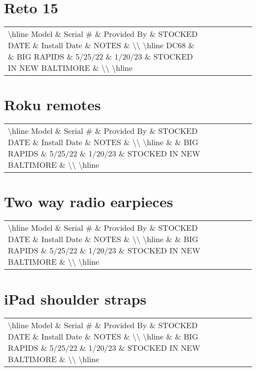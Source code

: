 \documentclass{article}%
\begin{document}
%
\section{Reto 15}%
\label{sec:Reto15}%
\begin{tabularx}{\textwidth}{|X|X|X|X|X|X|X|}%
\textbackslash{}hline%
Model \& Serial \# \& Provided By \& STOCKED DATE \& Install Date \& NOTES \&  \textbackslash{}\textbackslash{}%
\textbackslash{}hline%
DC68 \&  \& BIG RAPIDS \& 5/25/22 \& 1/20/23 \& STOCKED IN NEW BALTIMORE \&  \textbackslash{}\textbackslash{}%
\textbackslash{}hline%
\end{tabularx}

%
\section{Roku remotes}%
\label{sec:Rokuremotes}%
\begin{tabularx}{\textwidth}{|X|X|X|X|X|X|X|}%
\textbackslash{}hline%
Model \& Serial \# \& Provided By \& STOCKED DATE \& Install Date \& NOTES \&  \textbackslash{}\textbackslash{}%
\textbackslash{}hline%
 \&  \& BIG RAPIDS \& 5/25/22 \& 1/20/23 \& STOCKED IN NEW BALTIMORE \&  \textbackslash{}\textbackslash{}%
\textbackslash{}hline%
\end{tabularx}

%
\section{Two way radio earpieces }%
\label{sec:Twowayradioearpieces}%
\begin{tabularx}{\textwidth}{|X|X|X|X|X|X|X|}%
\textbackslash{}hline%
Model \& Serial \# \& Provided By \& STOCKED DATE \& Install Date \& NOTES \&  \textbackslash{}\textbackslash{}%
\textbackslash{}hline%
 \&  \& BIG RAPIDS \& 5/25/22 \& 1/20/23 \& STOCKED IN NEW BALTIMORE \&  \textbackslash{}\textbackslash{}%
\textbackslash{}hline%
\end{tabularx}

%
\section{iPad shoulder straps}%
\label{sec:iPadshoulderstraps}%
\begin{tabularx}{\textwidth}{|X|X|X|X|X|X|X|}%
\textbackslash{}hline%
Model \& Serial \# \& Provided By \& STOCKED DATE \& Install Date \& NOTES \&  \textbackslash{}\textbackslash{}%
\textbackslash{}hline%
 \&  \& BIG RAPIDS \& 5/25/22 \& 1/20/23 \& STOCKED IN NEW BALTIMORE \&  \textbackslash{}\textbackslash{}%
\textbackslash{}hline%
\end{tabularx}
\end{document}
